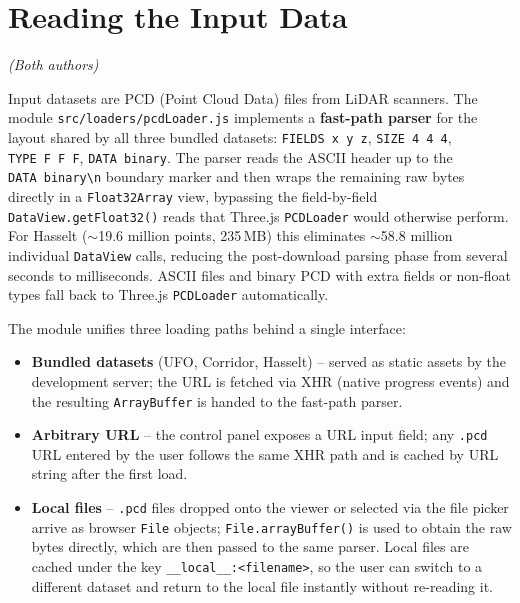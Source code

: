 \documentclass[12pt,a4paper]{article}
\begin{document}
\section{Reading the Input Data}
\label{sec:input}
\textit{(Both authors)}

Input datasets are PCD (Point Cloud Data) files from LiDAR scanners.
The module \texttt{src/loaders/pcdLoader.js} implements a \textbf{fast-path
parser} for the layout shared by all three bundled datasets:
\texttt{FIELDS~x~y~z}, \texttt{SIZE~4~4~4}, \texttt{TYPE~F~F~F},
\texttt{DATA~binary}. The parser reads the ASCII header up to the
\texttt{DATA~binary\textbackslash n} boundary marker and then wraps the
remaining raw bytes directly in a \texttt{Float32Array} view, bypassing the
field-by-field \texttt{DataView.getFloat32()} reads that Three.js
\texttt{PCDLoader} would otherwise perform. For Hasselt ($\sim$19.6 million
points, 235\,MB) this eliminates $\sim$58.8 million individual
\texttt{DataView} calls, reducing the post-download parsing phase from several
seconds to milliseconds. ASCII files and binary PCD with extra fields or
non-float types fall back to Three.js \texttt{PCDLoader} automatically.

The module unifies three loading paths behind a single interface:

\begin{itemize}
  \item \textbf{Bundled datasets} (UFO, Corridor, Hasselt) -- served as static
        assets by the development server; the URL is fetched via XHR (native
        progress events) and the resulting \texttt{ArrayBuffer} is handed to
        the fast-path parser.
  \item \textbf{Arbitrary URL} -- the control panel exposes a URL input field;
        any \texttt{.pcd} URL entered by the user follows the same XHR path and
        is cached by URL string after the first load.
  \item \textbf{Local files} -- \texttt{.pcd} files dropped onto the viewer or
        selected via the file picker arrive as browser \texttt{File} objects;
        \texttt{File.arrayBuffer()} is used to obtain the raw bytes directly,
        which are then passed to the same parser. Local files are cached under
        the key \texttt{\_\_local\_\_:<filename>}, so the user can switch to a
        different dataset and return to the local file instantly without
        re-reading it.
\end{itemize}
\end{document}
